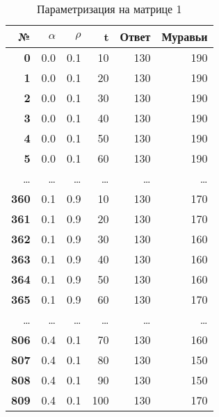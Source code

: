 \documentclass[a4paper,12pt]{article}
\begin{document}
\begin{table} [h!]
	\begin{center}
		\caption{Параметризация на матрице 1}
		\begin{tabular}{|r|r|r|r|r|r|}
			\hline
			{\bf №} & {\bf $\alpha$} &  {\bf $\rho$} &    {\bf t} & {\bf Ответ} & {\bf Муравьи} \\
			\hline
			{\bf 0} &        0.0 &        0.1 &       10 &        130 &        190 \\
			\hline
			{\bf 1} &        0.0 &        0.1 &       20 &        130 &        190 \\
			\hline
			{\bf 2} &        0.0 &        0.1 &       30 &        130 &        190 \\
			\hline
			{\bf 3} &        0.0 &        0.1 &       40 &        130 &        190 \\
			\hline
			{\bf 4} &        0.0 &        0.1 &       50 &        130 &        190 \\
			\hline
			{\bf 5} &        0.0 &        0.1 &       60 &        130 &        190 \\
			\hline
			\ldots & \ldots & \ldots & \ldots & \ldots & \ldots\\
			\hline
			{\bf 360} &        0.1 &        0.9 &       10 &        130 &        170 \\
			\hline
			{\bf 361} &        0.1 &        0.9 &       20 &        130 &        170 \\
			\hline
			{\bf 362} &        0.1 &        0.9 &       30 &        130 &        160 \\
			\hline
			{\bf 363} &        0.1 &        0.9 &       40 &        130 &        160 \\
			\hline
			{\bf 364} &        0.1 &        0.9 &       50 &        130 &        160 \\
			\hline
			{\bf 365} &        0.1 &        0.9 &       60 &        130 &        170 \\
			\hline
			\ldots & \ldots & \ldots & \ldots & \ldots & \ldots\\
			\hline
			{\bf 806} &        0.4 &        0.1 &       70 &        130 &        160 \\
			\hline
			{\bf 807} &        0.4 &        0.1 &       80 &        130 &        150 \\
			\hline
			{\bf 808} &        0.4 &        0.1 &       90 &        130 &        150 \\
			\hline
			{\bf 809} &        0.4 &        0.1 &      100 &        130 &        170 \\

\end{tabular}
\end{center}
\end{table}
\end{document}
